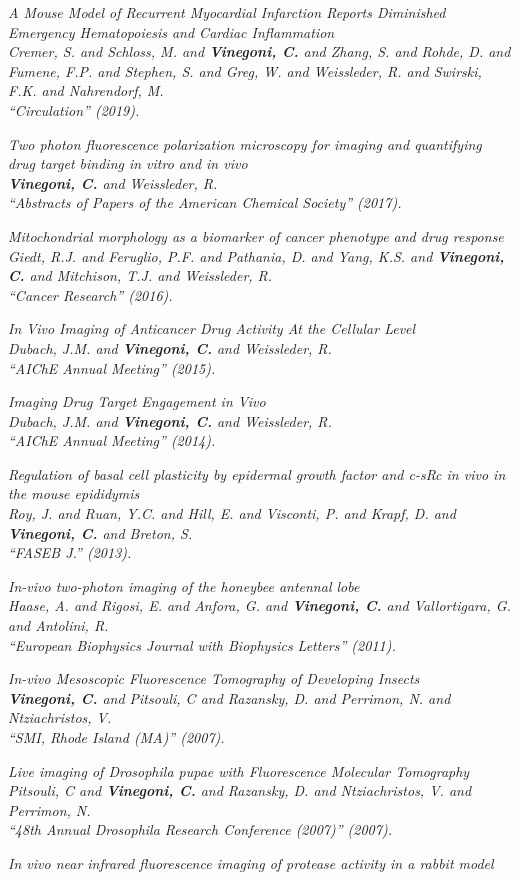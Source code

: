 \item \it A Mouse Model of Recurrent Myocardial Infarction Reports Diminished Emergency Hematopoiesis and Cardiac Inflammation \\ Cremer, S. and Schloss, M. and {\bf Vinegoni, C.} and Zhang, S. and Rohde, D. and Fumene, F.P. and Stephen, S. and Greg, W. and Weissleder, R. and Swirski, F.K. and Nahrendorf, M. \\ ``Circulation''  (2019). \item \it Two photon fluorescence polarization microscopy for imaging and quantifying drug target binding in vitro and in vivo \\ {\bf Vinegoni, C.} and Weissleder, R. \\ ``Abstracts of Papers of the American Chemical Society''  (2017). \item \it Mitochondrial morphology as a biomarker of cancer phenotype and drug response \\ Giedt, R.J. and Feruglio, P.F. and Pathania, D. and Yang, K.S. and {\bf Vinegoni, C.} and Mitchison, T.J. and Weissleder, R. \\ ``Cancer Research''  (2016). \item \it In Vivo Imaging of Anticancer Drug Activity At the Cellular Level \\ Dubach, J.M. and {\bf Vinegoni, C.} and Weissleder, R. \\ ``AIChE Annual Meeting''  (2015). \item \it Imaging Drug Target Engagement in Vivo \\ Dubach, J.M. and {\bf Vinegoni, C.} and Weissleder, R. \\ ``AIChE Annual Meeting''  (2014). \item \it Regulation of basal cell plasticity by epidermal growth factor and c-sRc in vivo in the mouse epididymis \\ Roy, J. and Ruan, Y.C. and Hill, E. and Visconti, P. and Krapf, D. and {\bf Vinegoni, C.} and Breton, S. \\ ``FASEB J.''  (2013). \item \it In-vivo two-photon imaging of the honeybee antennal lobe \\ Haase, A. and Rigosi, E. and Anfora, G. and {\bf Vinegoni, C.} and Vallortigara, G. and Antolini, R. \\ ``European Biophysics Journal with Biophysics Letters''  (2011). \item \it In-vivo Mesoscopic Fluorescence Tomography of Developing Insects \\ {\bf Vinegoni, C.} and Pitsouli, C and Razansky, D. and Perrimon, N. and Ntziachristos, V. \\ ``SMI, Rhode Island (MA)''  (2007). \item \it Live imaging of Drosophila pupae with Fluorescence Molecular Tomography \\ Pitsouli, C and {\bf Vinegoni, C.} and Razansky, D. and Ntziachristos, V. and Perrimon, N. \\ ``48th Annual Drosophila Research Conference (2007)''  (2007). \item \it In vivo near infrared fluorescence imaging of protease activity in a rabbit model 